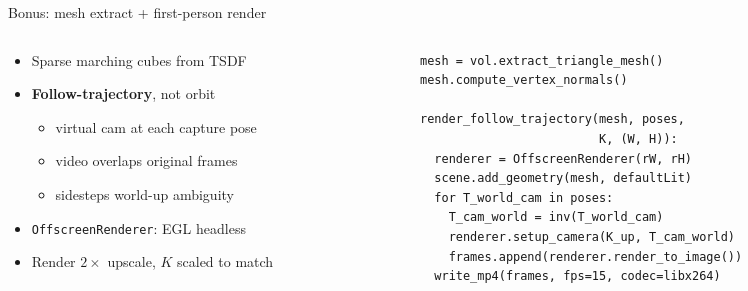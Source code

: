 \documentclass[aspectratio=169,11pt]{beamer}
\newcommand{\code}[1]{\texttt{#1}}
\begin{document}
\begin{frame}[fragile]{Bonus: mesh extract + first-person render}
\begin{columns}[T,totalwidth=\textwidth]
\begin{column}{0.46\textwidth}
\begin{itemize}
    \item Sparse marching cubes from TSDF
    \item \textbf{Follow-trajectory}, not orbit
    \begin{itemize}
        \item virtual cam at each capture pose
        \item video overlaps original frames
        \item sidesteps world-up ambiguity
    \end{itemize}
    \item \code{OffscreenRenderer}: EGL headless
    \item Render $2\times$ upscale, $K$ scaled to match
\end{itemize}
\end{column}
\begin{column}{0.50\textwidth}
\scriptsize
\begin{verbatim}
mesh = vol.extract_triangle_mesh()
mesh.compute_vertex_normals()

render_follow_trajectory(mesh, poses,
                         K, (W, H)):
  renderer = OffscreenRenderer(rW, rH)
  scene.add_geometry(mesh, defaultLit)
  for T_world_cam in poses:
    T_cam_world = inv(T_world_cam)
    renderer.setup_camera(K_up, T_cam_world)
    frames.append(renderer.render_to_image())
  write_mp4(frames, fps=15, codec=libx264)
\end{verbatim}
\end{column}
\end{columns}
\end{frame}
\end{document}

